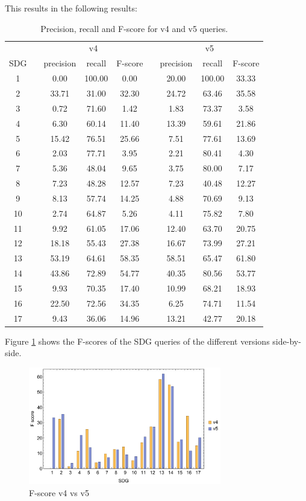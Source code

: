\documentclass{article}
\begin{document}
This results in the following results:

\begin{table}[H]
\centering 
\begin{tabular}{c c ccc c ccc}
\toprule
&&\multicolumn{3}{c}{v4}&&\multicolumn{3}{c}{v5}\\
\cline{3-5} \cline{7-9}
SDG && precision & recall & F-score && precision & recall & F-score \\
 \hline
 1 && 0.00 & 100.00 & 0.00 && 20.00 & 100.00 & 33.33 \\
 2 && 33.71 & 31.00 & 32.30 && 24.72 & 63.46 & 35.58 \\
 3 && 0.72 & 71.60 & 1.42 && 1.83 & 73.37 & 3.58 \\
 4 && 6.30 & 60.14 & 11.40 && 13.39 & 59.61 & 21.86 \\
 5 && 15.42 & 76.51 & 25.66 && 7.51 & 77.61 & 13.69 \\
 6 && 2.03 & 77.71 & 3.95 && 2.21 & 80.41 & 4.30 \\
 7 && 5.36 & 48.04 & 9.65 && 3.75 & 80.00 & 7.17 \\
 8 && 7.23 & 48.28 & 12.57 && 7.23 & 40.48 & 12.27 \\
 9 && 8.13 & 57.74 & 14.25 && 4.88 & 70.69 & 9.13 \\
 10 && 2.74 & 64.87 & 5.26 && 4.11 & 75.82 & 7.80 \\
 11 && 9.92 & 61.05 & 17.06 && 12.40 & 63.70 & 20.75 \\
 12 && 18.18 & 55.43 & 27.38 && 16.67 & 73.99 & 27.21 \\
 13 && 53.19 & 64.61 & 58.35 && 58.51 & 65.47 & 61.80 \\
 14 && 43.86 & 72.89 & 54.77 && 40.35 & 80.56 & 53.77 \\
 15 && 9.93 & 70.35 & 17.40 && 10.99 & 68.21 & 18.93 \\
 16 && 22.50 & 72.56 & 34.35 && 6.25 & 74.71 & 11.54 \\
 17 && 9.43 & 36.06 & 14.96 && 13.21 & 42.77 & 20.18 \\
 \bottomrule
\end{tabular}
\caption{Precision, recall and F-score for v4 and v5 queries.}
\label{precisiondatatab}
\end{table}

Figure \ref{f1barchart} shows the F-scores of the SDG queries of the different versions side-by-side. 
\begin{figure}[H]
	\centering
  \includegraphics[width=0.75\textwidth]{figures/f1barchart.pdf}
	\caption{F-score v4 vs v5}
	\label{f1barchart}
\end{figure}
\end{document}
